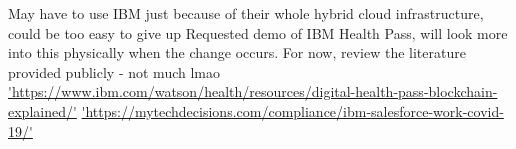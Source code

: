 May have to use IBM just because of their whole hybrid cloud infrastructure, could be too easy to give up \cite{noauthor_ibm_2020}
\linebreak[1]
Requested demo of IBM Health Pass, will look more into this physically when the change occurs. For now, review the literature provided publicly - not much lmao \url{'https://www.ibm.com/watson/health/resources/digital-health-pass-blockchain-explained/'}
\url{'https://mytechdecisions.com/compliance/ibm-salesforce-work-covid-19/'}
